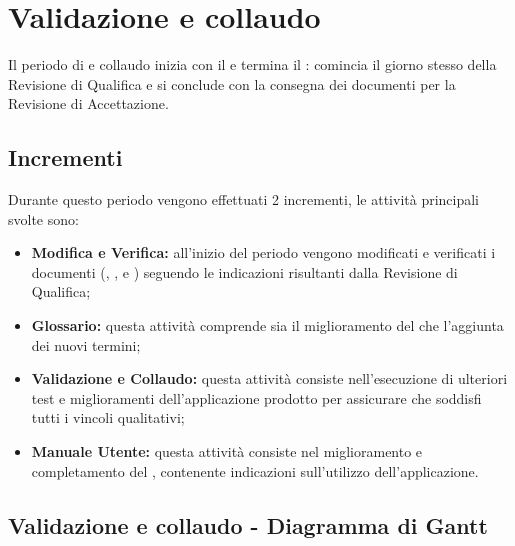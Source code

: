 \documentclass[PianoDiProgetto.tex]{subfiles}
\begin{document}
\section{Validazione e collaudo}
Il periodo di  e collaudo inizia con il  e termina il : comincia il giorno stesso della Revisione di Qualifica e si conclude con la consegna dei documenti per la Revisione di Accettazione.
\subsection{Incrementi}
Durante questo periodo vengono effettuati 2 incrementi, le attività principali svolte sono:
\begin{itemize}
\item \textbf{Modifica e Verifica:} all'inizio del periodo vengono modificati e verificati  i documenti (\ndp, \pdp, \pdq e \pb) seguendo le indicazioni risultanti dalla Revisione di Qualifica;
\item \textbf{Glossario:} questa attività comprende sia il miglioramento del \g che l'aggiunta dei nuovi termini;
\item \textbf{Validazione e Collaudo:} questa attività consiste nell'esecuzione di ulteriori test e miglioramenti dell'applicazione prodotto per assicurare che soddisfi tutti i vincoli qualitativi;
\item \textbf{Manuale Utente:} questa attività consiste nel miglioramento e completamento del \mut, contenente indicazioni sull'utilizzo dell'applicazione.

\end{itemize}
\begin{landscape}
\subsection{Validazione e collaudo - Diagramma di Gantt}
\end{landscape}	
\end{document}
